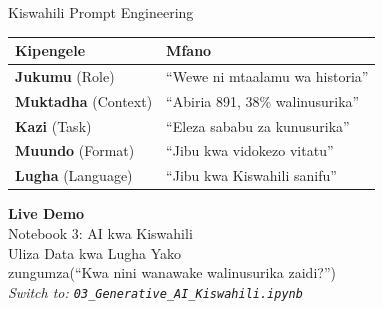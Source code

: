 \documentclass[aspectratio=169,12pt]{beamer}
\begin{document}
\begin{frame}{Kiswahili Prompt Engineering}
\begin{center}
{\small
\renewcommand{\arraystretch}{1.4}
\begin{tabular}{l l}
\toprule
\textbf{Kipengele} & \textbf{Mfano} \\
\midrule
\textbf{Jukumu} (Role) & ``Wewe ni mtaalamu wa historia'' \\
\textbf{Muktadha} (Context) & ``Abiria 891, 38\% walinusurika'' \\
\textbf{Kazi} (Task) & ``Eleza sababu za kunusurika'' \\
\textbf{Muundo} (Format) & ``Jibu kwa vidokezo vitatu'' \\
\textbf{Lugha} (Language) & ``Jibu kwa Kiswahili sanifu'' \\
\bottomrule
\end{tabular}
}
\end{center}
\vspace{0.3cm}
\begin{center}
\end{center}
\end{frame}

\begin{frame}[plain]
\begin{center}
\vspace{2cm}
{\Huge\textcolor{ubuntupurple}{\textbf{Live Demo}}}\\[0.5cm]
{\LARGE Notebook 3: AI kwa Kiswahili}\\[0.3cm]
{\large Uliza Data kwa Lugha Yako}\\[1cm]
{\normalsize zungumza(``Kwa nini wanawake walinusurika zaidi?'')}\\[1.5cm]
\textit{\small Switch to: \texttt{03\_Generative\_AI\_Kiswahili.ipynb}}
\end{center}
\end{frame}
\end{document}
